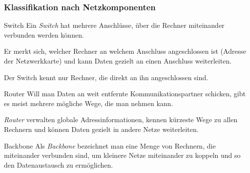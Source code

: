 \subsubsection{Klassifikation nach Netzkomponenten}

\begin{defi}{Switch}
    Ein \emph{Switch} hat mehrere Anschlüsse, über die Rechner miteinander verbunden werden können.

    Er merkt sich, welcher Rechner an welchem Anschluss angeschlossen ist (Adresse der Netzwerkkarte) und kann Daten gezielt an einen Anschluss weiterleiten.

    Der Switch kennt nur Rechner, die direkt an ihn angeschlossen sind.
\end{defi}

\begin{defi}{Router}
    Will man Daten an weit entfernte Kommunikationspartner schicken, gibt es meist mehrere mögliche Wege, die man nehmen kann.

    \emph{Router} verwalten globale Adressinformationen, kennen kürzeste Wege zu allen Rechnern und können Daten gezielt in andere Netze weiterleiten.
\end{defi}

\begin{defi}{Backbone}
    Als \emph{Backbone} bezeichnet man eine Menge von Rechnern, die miteinander verbunden sind, um kleinere Netze miteinander zu koppeln und so den Datenaustausch zu ermöglichen.
\end{defi}